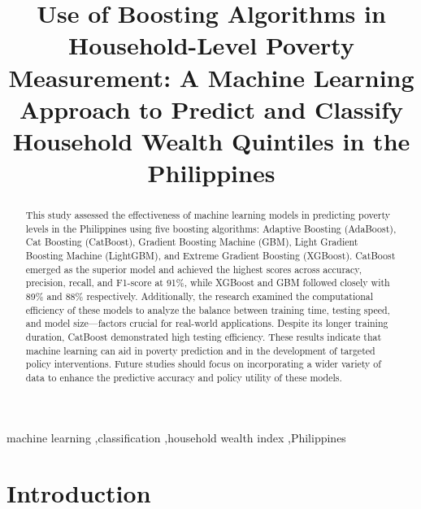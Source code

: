 \documentclass[a4paper,fleqn]{cas-sc}
\begin{document}
\let\WriteBookmarks\relax
\def\floatpagepagefraction{1}
\def\textpagefraction{.001}

\title [mode = title]{Use of Boosting Algorithms in Household-Level Poverty Measurement: A Machine Learning Approach to Predict and Classify Household Wealth Quintiles in the Philippines
}                      

\begin{abstract}
This study assessed the effectiveness of machine learning models in predicting poverty levels in the Philippines using five boosting algorithms: Adaptive Boosting (AdaBoost), Cat Boosting (CatBoost), Gradient Boosting Machine (GBM), Light Gradient Boosting Machine (LightGBM), and Extreme Gradient Boosting (XGBoost). CatBoost emerged as the superior model and achieved the highest scores across accuracy, precision, recall, and F1-score at 91\%, while XGBoost and GBM followed closely with 89\% and 88\% respectively. Additionally, the research examined the computational efficiency of these models to analyze the balance between training time, testing speed, and model size—factors crucial for real-world applications. Despite its longer training duration, CatBoost demonstrated high testing efficiency. These results indicate that machine learning can aid in poverty prediction and in the development of targeted policy interventions. Future studies should focus on incorporating a wider variety of data to enhance the predictive accuracy and policy utility of these models.
\end{abstract}

\begin{keywords}
machine learning \sep classification \sep household wealth index \sep Philippines
\end{keywords}


\maketitle

\section{Introduction}
\end{document}
